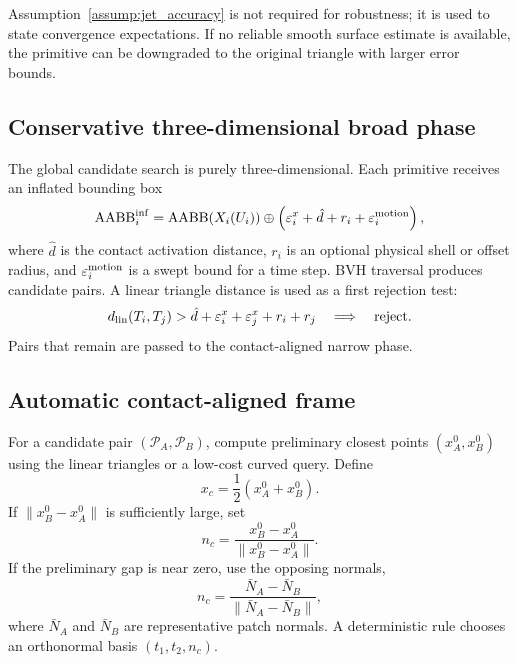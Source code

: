 \documentclass[preprint,12pt]{elsarticle}
\newcommand{\Pc}{\mathcal{P}}
\newcommand{\eps}{\varepsilon}
\begin{document}
Assumption~\ref{assump:jet_accuracy} is not required for robustness; it is used to state convergence expectations. If no reliable smooth surface estimate is available, the primitive can be downgraded to the original triangle with larger error bounds.

\subsection{Conservative three-dimensional broad phase}

The global candidate search is purely three-dimensional. Each primitive receives an inflated bounding box
\begin{equation}
    \operatorname{AABB}_i^{\rm inf}
    =\operatorname{AABB}(X_i(U_i))\oplus
    \left(\eps_i^x+\hat d+r_i+\eps_i^{\rm motion}\right),
    \label{eq:inflated_aabb}
\end{equation}
where $\hat d$ is the contact activation distance, $r_i$ is an optional physical shell or offset radius, and $\eps_i^{\rm motion}$ is a swept bound for a time step. BVH traversal produces candidate pairs. A linear triangle distance is used as a first rejection test:
\begin{equation}
    d_{\rm lin}(T_i,T_j)>\hat d+\eps_i^x+\eps_j^x+r_i+r_j
    \quad\Longrightarrow\quad \text{reject}.
\end{equation}
Pairs that remain are passed to the contact-aligned narrow phase.

\subsection{Automatic contact-aligned frame}
\label{subsec:contact_frame}

For a candidate pair $(\Pc_A,\Pc_B)$, compute preliminary closest points $(x_A^0,x_B^0)$ using the linear triangles or a low-cost curved query. Define
\begin{equation}
    x_c=\frac{1}{2}(x_A^0+x_B^0).
\end{equation}
If $\|x_B^0-x_A^0\|$ is sufficiently large, set
\begin{equation}
    n_c=\frac{x_B^0-x_A^0}{\|x_B^0-x_A^0\|}.
    \label{eq:contact_normal_from_gap}
\end{equation}
If the preliminary gap is near zero, use the opposing normals,
\begin{equation}
    n_c=\frac{\bar N_A-\bar N_B}{\|\bar N_A-\bar N_B\|},
    \label{eq:contact_normal_from_normals}
\end{equation}
where $\bar N_A$ and $\bar N_B$ are representative patch normals. A deterministic rule chooses an orthonormal basis $(t_1,t_2,n_c)$.
\end{document}
